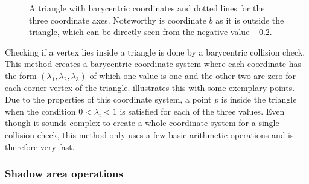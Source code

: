 			\begin{figure}[h]
				\begin{figcenter}
				\end{figcenter}
				\caption{A triangle with barycentric coordinates and dotted lines for the three coordinate axes. Noteworthy is coordinate $b$ as it is outside the triangle, which can be directly seen from the negative value $-0.2$.}
				\label{fig:barycentric-triangle}
			\end{figure}
			
			Checking if a vertex lies inside a triangle is done by a barycentric collision check.
			This method creates a barycentric coordinate system where each coordinate has the form $(\lambda_1,\lambda_2,\lambda_3)$ of which one value is one and the other two are zero for each corner vertex of the triangle.
			 illustrates this with some exemplary points.
			Due to the properties of this coordinate system, a point $p$ is inside the triangle when the condition $0 < \lambda_i < 1$ is satisfied for each of the three values.
			Even though it sounds complex to create a whole coordinate system for a single collision check, this method only uses a few basic arithmetic operations and is therefore very fast.
			
		\subsubsection{Shadow area operations}
			
